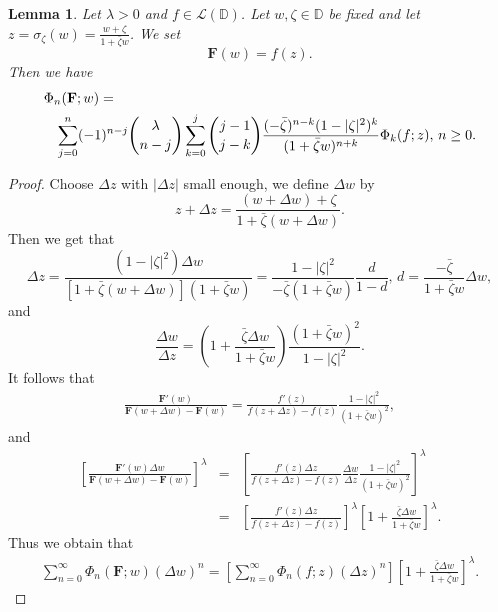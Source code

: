 \documentclass[10pt]{amsart}
\newtheorem{lemma}[theorem]{Lemma}
\theoremstyle{definition}
\theoremstyle{remark}
\numberwithin{equation}{section}
\begin{document}
\begin{lemma}\label{lemma-2}
Let $\lambda>0$ and $f\in \mathcal{L}(\mathbb{D})$. Let $w, \zeta\in \mathbb{D}$ be fixed and let $z=\sigma_{\zeta}(w)=\frac{w+\zeta}{1+\bar{\zeta}w}$.  We set
$$\mathbf{F}(w)=f(z).$$
Then we have 
\begin{eqnarray}\label{l-22}
\lefteqn{\Phi_{n}(\mathbf{F}; w)=} \nonumber\\
&&\sum_{j=0}^{n}(-1)^{n-j}\binom{\lambda}{n-j}\sum_{k=0}^{j}\binom{j-1}{j-k}\frac{(-\bar{\zeta})^{n-k}(1-|\zeta|^2)^{k}}{(1+\bar{\zeta}w)^{n+k}}\Phi_{k}(f; z), \, n\geq 0.
\end{eqnarray}
\end{lemma} 
\begin{proof}
Choose $\Delta z$ with $|\Delta z|$ small enough, we define $\Delta w$ by 
\begin{equation}
z+\Delta z=\frac{(w+\Delta w)+\zeta}{1+\bar{\zeta}(w+\Delta w)}.\nonumber 
\end{equation}
Then we get that 
\begin{equation}\label{d-con}
\Delta z=\frac{(1-|\zeta|^2)\Delta w}{[1+\bar{\zeta}(w+\Delta w)](1+\bar{\zeta} w)}=\frac{1-|\zeta|^2}{-\bar{\zeta}(1+\bar{\zeta}w)} \frac{d}{1-d}, \, d=\frac{-\bar{\zeta}}{1+\bar{\zeta} w} \Delta w,
\end{equation}
and
\begin{equation}
\frac{\Delta w}{\Delta z}=\left(1+\frac{\bar{\zeta} \Delta w }{1+\bar{\zeta}w}\right) \frac{(1+\bar{\zeta}w)^2}{1-|\zeta|^2}.\nonumber 
\end{equation}
It follows that 
\begin{eqnarray}
\frac{\mathbf{F}'(w)}{\mathbf{F}(w+\Delta w)-\mathbf{F}(w)}=\frac {f'(z)}{f(z+\Delta z)-f(z)} \frac{1-|\zeta|^2}{(1+\bar{\zeta}w)^2}, \nonumber 
\end{eqnarray}
and 
\begin{eqnarray}
\left[\frac{\mathbf{F}'(w)\Delta w}{\mathbf{F}(w+\Delta w)-\mathbf{F}(w)}\right]^{\lambda}&=&\left[\frac{f'(z)\Delta z}{f(z+\Delta z)-f(z)}\frac{\Delta w}{\Delta z} \frac{1-|\zeta|^2}{(1+\bar{\zeta}w)^2}\right]^{\lambda} \nonumber \\
&=& \left[\frac{f'(z)\Delta z}{f(z+\Delta z)-f(z)}\right]^{\lambda}\left[1+\frac{\bar{\zeta} \Delta w }{1+\bar{\zeta}w}\right]^{\lambda}.\nonumber 
\end{eqnarray}
Thus we obtain that 
\begin{eqnarray}\label{eee}
\sum_{n=0}^{\infty}\Phi_{n}(\mathbf{F}; w)(\Delta w)^n=\left[\sum_{n=0}^{\infty}\Phi_{n}(f; z)(\Delta z)^n\right]\left[1+\frac{\bar{\zeta} \Delta w }{1+\bar{\zeta}w}\right]^{\lambda}.
\end{eqnarray}


\end{proof}
\end{document}
